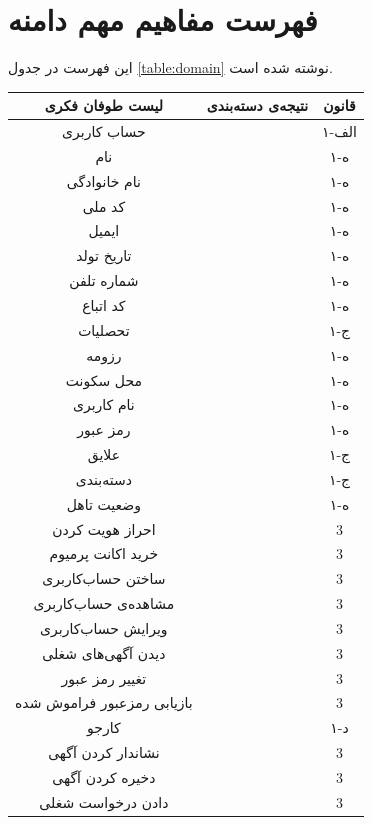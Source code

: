 \documentclass[12pt,svgnames,oneside]{book}
\newcommand{\myc}{\lr{C}}
\newcommand{\mya}{\lr{A}}
\newcommand{\asus}{\lr{AS(user, system)}}
\newcommand{\asjs}{\lr{AS(job seeker, system)}}
\newcommand{\asje}{\lr{AS(job seeker, the employer)}}
\newcommand{\onealef}{۱-الف}
\newcommand{\oneh}{۱-ه}
\newcommand{\oned}{۱-د}
\newcommand{\onej}{۱-ج}
\begin{document}
\section{فهرست مفاهیم مهم دامنه}
این فهرست در جدول \ref{table:domain} نوشته شده است.

\begin{longtable}{|c|c|c|}
\hline		لیست طوفان فکری &		نتیجه‌ی دسته‌بندی &		قانون \\
\hline
\hline		حساب کاربری &
\myc &
\onealef \\
\hline		نام &
\mya &
\oneh \\
\hline		نام خانوادگی &
\mya &
\oneh \\
\hline		کد ملی &
\mya &
\oneh \\
\hline		ایمیل &
\mya &
\oneh \\
\hline		تاریخ تولد &
\mya &
\oneh \\
\hline		شماره تلفن &
\mya &
\oneh \\
\hline		کد اتباع &
\mya &
\oneh \\
\hline		تحصلیات &
\myc &
\onej \\
\hline		رزومه &
\mya &
\oneh \\
\hline		محل سکونت &
\mya &
\oneh \\
\hline		نام کاربری &
\mya &
\oneh \\
\hline		رمز عبور &
\mya &
\oneh \\
\hline		علایق &
\myc &
\onej \\
\hline		دسته‌بندی&
\myc &
\onej \\
\hline		وضعیت تاهل &
\mya &
\oneh \\
\hline		احراز هویت کردن &
\asus &
3 \\
\hline		خرید اکانت پرمیوم &
\asus &
3 \\
\hline		ساختن حساب‌کاربری &
\asus &
3 \\
\hline		مشاهده‌ی حساب‌کاربری &
\asus &
3 \\
\hline		ویرایش حساب‌‌کاربری &
\asus &
3 \\
\hline		دیدن آگهی‌های شغلی &
\asus &
3 \\
\hline		تغییر رمز عبور &
\asus &
3 \\
\hline		بازیابی رمزعبور فراموش شده &
\asus &
3 \\
\hline		کارجو &
\myc &
\oned \\
\hline
نشاندار کردن آگهی		&
\asjs &
3 \\
\hline
دخیره کردن آگهی &
\asjs &
3 \\
\hline
دادن درخواست شغلی &
\asje &
3 \\

\end{longtable}
\end{document}
